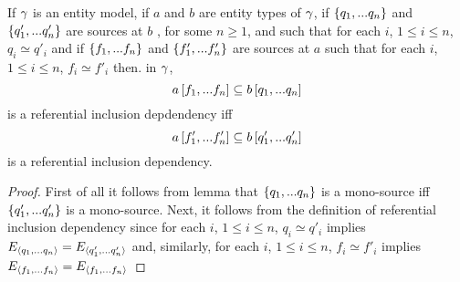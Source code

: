 \begin{lemma}
If $\gamma$ is an entity model, 
if $a$ and $b$ are entity types of  $\gamma$,  if $\left\{q_1,...q_n\right\}$
and $\left\{q'_1,...q'_n\right\}$ are sources at $b$ , for some $n \geq 1$,
and such that for each $i$, $1 \leq i \leq n$, $q_i \simeq q'_i$  
and if $\left\{f_1,...f_n\right\}$ and $\left\{f'_1,...f'_n\right\}$ are sources at $a$
such that for each $i$, $1 \leq i \leq n$, $f_i \simeq f'_i$
then. in $\gamma$, 
\begin{equation}
\label{incdequivalence1}
a\left[f_1,...f_n\right]\subseteq b\left[q_1,...q_n\right]
\end{equation}
is a referential inclusion depdendency iff
\begin{equation}
\label{incdequivalence2}
a\left[f'_1,...f'_n\right]\subseteq b\left[q'_1,...q'_n\right]
\end{equation}
is a referential inclusion dependency.

\end{lemma}
\begin{proof}
First of all it follows from lemma  that $\left\{q_1,...q_n\right\}$ is a mono-source iff
$\left\{q'_1,...q'_n\right\}$ is a mono-source.
Next, it follows from the definition of referential inclusion dependency
 since for each $i$, $1 \leq i \leq n$, $q_i \simeq q'_i$  implies $E_{\langle q_1,...q_n\rangle} =
E_{\langle q'_1,...q'_n\rangle}$ and,
similarly, for each $i$, $1 \leq i \leq n$, $f_i \simeq f'_i$  implies $E_{\langle f_1,...f_n\rangle} =
E_{\langle f_1,...f_n\rangle}$
\end{proof}

